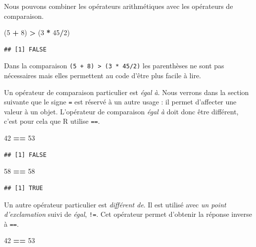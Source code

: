 \documentclass[
]{book}
\newenvironment{Shaded}{\begin{snugshade}}{\end{snugshade}}
\newcommand{\DecValTok}[1]{\textcolor[rgb]{0.00,0.00,0.81}{#1}}
\newcommand{\NormalTok}[1]{#1}
\newcommand{\OperatorTok}[1]{\textcolor[rgb]{0.81,0.36,0.00}{\textbf{#1}}}
\newcommand{\StringTok}[1]{\textcolor[rgb]{0.31,0.60,0.02}{#1}}
\begin{document}
Nous pouvons combiner les opérateurs arithmétiques avec les opérateurs de comparaison.

\begin{Shaded}
\begin{Highlighting}[]
\NormalTok{(}\DecValTok{5} \OperatorTok{+}\StringTok{ }\DecValTok{8}\NormalTok{) }\OperatorTok{>}\StringTok{ }\NormalTok{(}\DecValTok{3} \OperatorTok{*}\StringTok{ }\DecValTok{45}\OperatorTok{/}\DecValTok{2}\NormalTok{) }
\end{Highlighting}
\end{Shaded}

\begin{verbatim}
## [1] FALSE
\end{verbatim}

Dans la comparaison \texttt{(5\ +\ 8)\ \textgreater{}\ (3\ *\ 45/2)} les parenthèses ne sont pas nécessaires mais elles permettent au code d'être plus facile à lire.

Un opérateur de comparaison particulier est \emph{égal à}. Nous verrons dans la section suivante que le signe \texttt{=} est réservé à un autre usage : il permet d'affecter une valeur à un objet. L'opérateur de comparaison \emph{égal à} doit donc être différent, c'est pour cela que R utilise \texttt{==}.

\begin{Shaded}
\begin{Highlighting}[]
\DecValTok{42} \OperatorTok{==}\StringTok{ }\DecValTok{53}
\end{Highlighting}
\end{Shaded}

\begin{verbatim}
## [1] FALSE
\end{verbatim}

\begin{Shaded}
\begin{Highlighting}[]
\DecValTok{58} \OperatorTok{==}\StringTok{ }\DecValTok{58}
\end{Highlighting}
\end{Shaded}

\begin{verbatim}
## [1] TRUE
\end{verbatim}

Un autre opérateur particulier est \emph{différent de}. Il est utilisé avec \emph{un point d'exclamation} suivi de \emph{égal}, \texttt{!=}. Cet opérateur permet d'obtenir la réponse inverse à \texttt{==}.

\begin{Shaded}
\begin{Highlighting}[]
\DecValTok{42} \OperatorTok{==}\StringTok{ }\DecValTok{53}
\end{Highlighting}
\end{Shaded}
\end{document}
